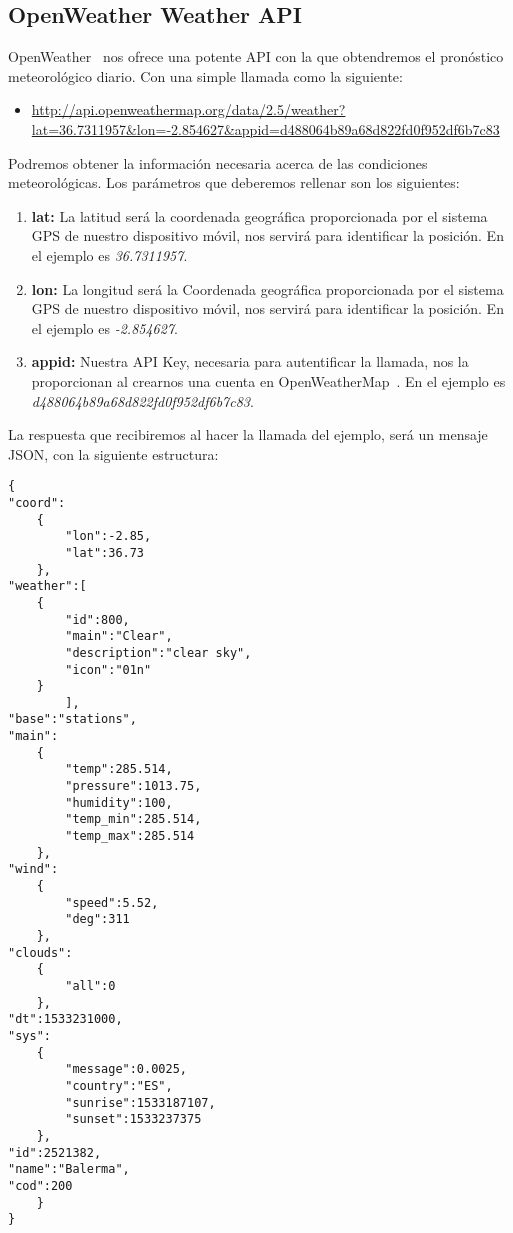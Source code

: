 \subsection{OpenWeather Weather API}

OpenWeather~\cite{OPENWEATHER} nos ofrece una potente API con la que obtendremos
 el pronóstico meteorológico diario. Con una simple llamada como la 
siguiente:
\begin{itemize}


\item  \url{http://api.openweathermap.org/data/2.5/weather?lat=36.7311957&lon=-2.854627&appid=d488064b89a68d822fd0f952df6b7c83}
\end{itemize}
Podremos obtener la información necesaria acerca de las condiciones meteorológicas.
 Los parámetros que deberemos rellenar son los siguientes:

\begin{enumerate}
\item \textbf{lat:} La latitud será la coordenada geográfica proporcionada 
por el sistema GPS de nuestro dispositivo móvil, nos servirá para identificar
 la posición. En el ejemplo es \emph{36.7311957}.
\item \textbf{lon:} La longitud será la Coordenada geográfica 
proporcionada por el sistema GPS de nuestro dispositivo móvil, 
nos servirá para identificar la posición. En el ejemplo es \emph{-2.854627}.
\item \textbf{appid:} Nuestra API Key, necesaria para autentificar
 la llamada, nos la proporcionan al crearnos una cuenta en 
OpenWeatherMap~\cite{OPENWEATHER}. 
En el ejemplo es \emph{d488064b89a68d822fd0f952df6b7c83}.
\end{enumerate}

La respuesta que recibiremos al hacer la llamada del ejemplo,
 será un mensaje JSON, con la siguiente estructura:
\\
\begin{lstlisting}
{
"coord":
	{
		"lon":-2.85,
		"lat":36.73
	},
"weather":[
	{
		"id":800,
		"main":"Clear",
		"description":"clear sky",
		"icon":"01n"
	}
		],
"base":"stations",
"main":
	{
		"temp":285.514,
		"pressure":1013.75,
		"humidity":100,
		"temp_min":285.514,
		"temp_max":285.514
	},
"wind":
	{
		"speed":5.52,
		"deg":311
	},
"clouds":
	{
		"all":0
	},
"dt":1533231000,
"sys":
	{
		"message":0.0025,
		"country":"ES",
		"sunrise":1533187107,
		"sunset":1533237375
	},
"id":2521382,
"name":"Balerma",
"cod":200
	}
}
\end{lstlisting}

